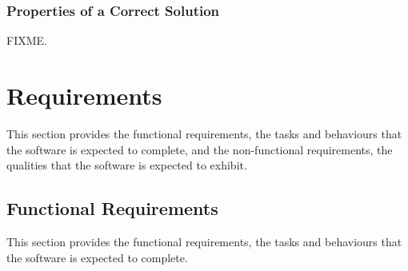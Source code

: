 \documentclass[12pt]{article}
\begin{document}
\subsubsection{Properties of a Correct Solution}
\label{Sec:CorSolProps}
FIXME.
\section{Requirements}
\label{Sec:Requirements}
This section provides the functional requirements, the tasks and behaviours that the software is expected to complete, and the non-functional requirements, the qualities that the software is expected to exhibit.
\subsection{Functional Requirements}
\label{Sec:FRs}
This section provides the functional requirements, the tasks and behaviours that the software is expected to complete.
\end{document}

